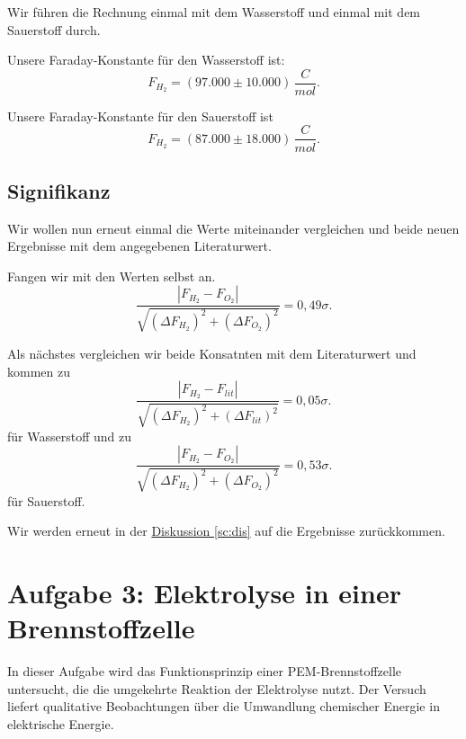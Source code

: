 Wir führen die Rechnung einmal mit dem Wasserstoff und einmal mit dem Sauerstoff durch.

Unsere Faraday-Konstante für den Wasserstoff ist:
\begin{equation}
    \boxed{
        F_{H_2} = (97.000 \pm 10.000) \, \frac{C}{mol}.
    }
\end{equation}

Unsere Faraday-Konstante für den Sauerstoff ist
\begin{equation}
    \boxed{
        F_{H_2} = (87.000 \pm 18.000) \, \frac{C}{mol}.
    }
\end{equation}

\subsection*{Signifikanz}
Wir wollen nun erneut einmal die Werte miteinander vergleichen und beide neuen Ergebnisse mit dem angegebenen Literaturwert.

Fangen wir mit den Werten selbst an.
\begin{equation}
    \frac{\left| F_{H_2} - F_{O_2} \right|}{\sqrt{(\Delta F_{H_2})^2 + (\Delta F_{O_2})^2}} = 0,49\sigma.
\end{equation}

Als nächstes vergleichen wir beide Konsatnten mit dem Literaturwert und kommen zu
\begin{equation}
    \frac{\left| F_{H_2} - F_{lit} \right|}{\sqrt{(\Delta F_{H_2})^2 + (\Delta F_{lit})^2}} = 0,05\sigma.
\end{equation}
für Wasserstoff
und zu
\begin{equation}
    \frac{\left| F_{H_2} - F_{O_2} \right|}{\sqrt{(\Delta F_{H_2})^2 + (\Delta F_{O_2})^2}} = 0,53\sigma.
\end{equation}
für Sauerstoff.

Wir werden erneut in der \hyperref[sc:dis]{Diskussion \ref*{sc:dis}} auf die Ergebnisse zurückkommen.

\section{Aufgabe 3: Elektrolyse in einer Brennstoffzelle}

In dieser Aufgabe wird das Funktionsprinzip einer PEM-Brennstoffzelle untersucht, die die umgekehrte Reaktion der Elektrolyse nutzt. Der Versuch liefert qualitative Beobachtungen über die Umwandlung chemischer Energie in elektrische Energie.

